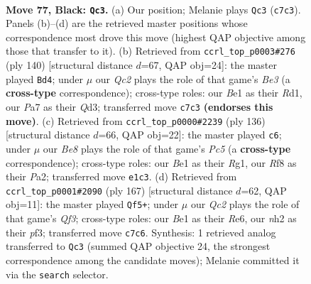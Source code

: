 \documentclass[11pt]{article}
\begin{document}
\clearpage

\begin{figure}[p]\centering
\begin{subfigure}{0.46\textwidth}\centering
\resizebox{\linewidth}{!}{%
\newchessgame
\chessboard[
  setfen={2k2r1r/p1q3p1/7p/7P/3P2P1/4P3/7N/1Q2b2K b - - 4 77},
  showmover=false,
  pgfstyle=straightmove, color=movearrow, markmove={c7-c3}
]}
\caption{}
\end{subfigure}\hfill
\begin{subfigure}{0.46\textwidth}\centering
\resizebox{\linewidth}{!}{%
\newchessgame
\chessboard[
  setfen={1r5k/2n3p1/7p/4PP1q/2P5/3QB3/P7/K2R4 w - - 2 71},
  showmover=false,
  pgfstyle=straightmove, color=movearrow, markmove={e3-d4}
]}
\caption{}
\end{subfigure}
\\[4pt]
\begin{subfigure}{0.46\textwidth}\centering
\resizebox{\linewidth}{!}{%
\newchessgame
\chessboard[
  setfen={5r2/p5pk/7p/2P5/3q4/7P/P5Q1/6RK w - - 2 69},
  showmover=false,
  pgfstyle=straightmove, color=movearrow, markmove={c5-c6}
]}
\caption{}
\end{subfigure}\hfill
\begin{subfigure}{0.46\textwidth}\centering
\resizebox{\linewidth}{!}{%
\newchessgame
\chessboard[
  setfen={6Q1/8/1p2rq1k/2p4p/8/2P2P1K/3R2P1/8 b - - 4 84},
  showmover=false,
  pgfstyle=straightmove, color=movearrow, markmove={f6-f5}
]}
\caption{}
\end{subfigure}
\caption{\textbf{Move 77, Black: \texttt{Qc3}.} (a) Our position; Melanie plays \texttt{Qc3} (\texttt{c7c3}). Panels (b)--(d) are the retrieved master positions whose correspondence most drove this move (highest QAP objective among those that transfer to it). (b) Retrieved from \texttt{ccrl\_top\_p0003\#276} (ply 140) [structural distance $d$=67, QAP obj=24]: the master played \texttt{Bd4}; under $\mu$ our \emph{Qc2} plays the role of that game's \emph{Be3} (a \textbf{cross-type} correspondence); cross-type roles: our \emph{B}e1 as their \emph{R}d1, our \emph{P}a7 as their \emph{Q}d3; transferred move \texttt{c7c3} \textbf{(endorses this move)}. (c) Retrieved from \texttt{ccrl\_top\_p0000\#2239} (ply 136) [structural distance $d$=66, QAP obj=22]: the master played \texttt{c6}; under $\mu$ our \emph{Be8} plays the role of that game's \emph{Pc5} (a \textbf{cross-type} correspondence); cross-type roles: our \emph{B}e1 as their \emph{R}g1, our \emph{R}f8 as their \emph{P}a2; transferred move \texttt{e1c3}. (d) Retrieved from \texttt{ccrl\_top\_p0001\#2090} (ply 167) [structural distance $d$=62, QAP obj=11]: the master played \texttt{Qf5+}; under $\mu$ our \emph{Qc2} plays the role of that game's \emph{Qf3}; cross-type roles: our \emph{B}e1 as their \emph{R}e6, our \emph{n}h2 as their \emph{p}f3; transferred move \texttt{c7c6}. Synthesis: 1 retrieved analog transferred to \texttt{Qc3} (summed QAP objective 24, the strongest correspondence among the candidate moves); Melanie committed it via the \texttt{search} selector.}
\label{fig:thought-m153}
\end{figure}
\end{document}
